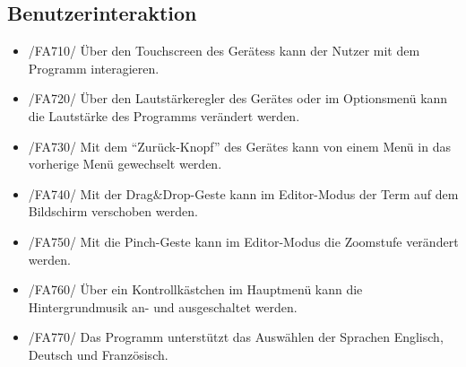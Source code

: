 \subsection{Benutzerinteraktion}

\begin{itemize}
\item /FA710/ Über den Touchscreen des Gerätess kann der Nutzer mit dem Programm interagieren.
\item /FA720/ Über den Lautstärkeregler des Gerätes oder im Optionsmenü kann die Lautstärke des Programms verändert werden.
\item /FA730/ Mit dem "`Zurück-Knopf"' des Gerätes kann von einem Menü in das vorherige Menü gewechselt werden.
\item /FA740/ Mit der Drag\&Drop-Geste kann im Editor-Modus der Term auf dem Bildschirm verschoben werden.
\item /FA750/ Mit die Pinch-Geste kann im Editor-Modus die Zoomstufe verändert werden.
\item /FA760/ Über ein Kontrollkästchen im Hauptmenü kann die Hintergrundmusik an- und ausgeschaltet werden.
\item /FA770/ Das Programm unterstützt das Auswählen der Sprachen Englisch, Deutsch und Französisch.
\end{itemize}